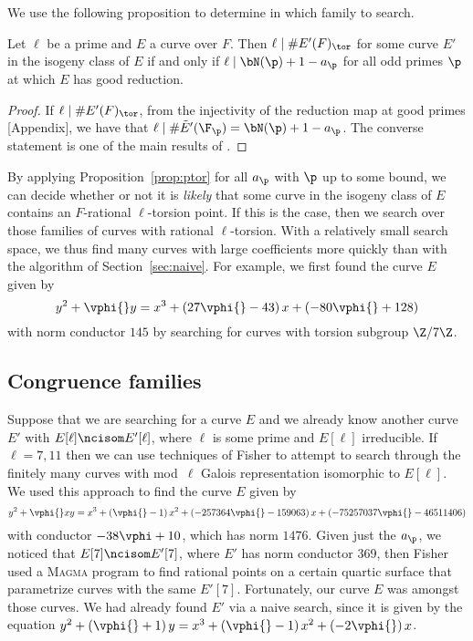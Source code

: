 \documentclass{amsart}
\begin{document}
We use the following proposition to determine in which family to
search.
\begin{proposition}\label{prop:ptor}
Let $\ell$ be a prime and $E$ a curve over $F$.
Then $\ell \mid \# E'(F)_{\tor}$ for some curve $E'$ in the isogeny class
of $E$ if and only if $\ell \mid \bN(\p)+1 - a_{\p}$ for all
odd primes $\p$ at which $E$ has good reduction.
\end{proposition}
\begin{proof}
If $\ell  \mid \# E'(F)_{\tor}$, from the injectivity of the
reduction map at good primes \cite{katz:torsion}[Appendix], we have that
$\ell \mid \#\tilde E'(\F_\p) = \bN(\p)+1 - a_{\p}$. The converse statement
is one of the main results of \cite{katz:torsion}.
\end{proof}

By applying Proposition~\ref{prop:ptor} for all $a_{\p}$ with $\p$ up
to some bound, we can decide whether or not it is {\em likely} that
some curve in the isogeny class of $E$ contains an $F$-rational
$\ell$-torsion point. If this is the case, then we search over those
families of curves with rational $\ell$-torsion. With a relatively small
search space, we thus find many curves with large coefficients more
quickly than with the algorithm of Section~\ref{sec:naive}.
For example, we first found the curve $E$ given by 
$$y^2 + \vphi{}y = x^3 + \left(27 \vphi{} - 43\right)x + \left(-80 \vphi{} + 128\right) 
$$ with norm conductor $145$ by searching for curves with torsion subgroup $\Z/7\Z$.


\subsection{Congruence families}\label{sec:congfam}
Suppose that we are searching for a curve $E$ and we already know
another curve $E'$ with $E[\ell] \ncisom E'[\ell]$, where $\ell$ is
some prime and $E[\ell]$ irreducible.  If $\ell=7,11$ then we can use
techniques of Fisher \cite{fisher:families_cong} to attempt to search
through the finitely many curves with mod~$\ell$ Galois representation
isomorphic to $E[\ell]$.
We used this approach to find the curve $E$ given by
\begin{equation}\label{equation:fisher-curve}
y^2 + \vphi{}xy = x^3 + \left(\vphi{} - 1\right)x^2 + \left(-257364 \vphi{} - 159063\right)x + \left(-75257037 \vphi{} - 46511406\right)
\end{equation}
with conductor $-38 \vphi + 10$, which has norm $1476$.  Given just the $a_{\p}$, we noticed that
$E[7] \ncisom E'[7]$, where $E'$ has norm conductor 369, then Fisher
used a \textsc{Magma} program to find rational points on a certain
quartic surface that parametrize curves with the same $E'[7]$.
Fortunately, our curve $E$ was amongst those curves.
We had already found $E'$ via a naive search, since it is given
by the equation $y^2 + \left(\vphi{} + 1\right)y = x^3 + \left(\vphi{} - 1\right)x^2 + \left(-2 \vphi{}\right)x$.
\end{document}
